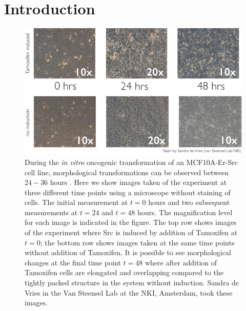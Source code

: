 
\section{Introduction}
\label{sec:introduction-mcf10}


\begin{figure}
  \centering
  \includegraphics[width=1\textwidth]{pics/mcf10a-experiment}
  \caption{
  During the {\it in vitro} oncogenic transformation of an MCF10A-Er-Src cell line, morphological transformations can be observed between $24-36$ hours \citep{Hirsch:2010ec}. Here we show images taken of the experiment at three different time points using a microscope without staining of cells. The initial measurement at $t=0$ hours and two subsequent measurements at $t=24$ and $t=48$ hours. The magnification level for each image is indicated in the figure. The top row shows images of the experiment where Src is induced by addition of Tamoxifen at $t=0$; the bottom row shows images taken at the same time points without addition of Tamoxifen. It is possible to see morphological changes at the final time point $t=48$ where after addition of Tamoxifen cells are elongated and overlapping compared to the tightly packed structure in the system without induction. Sandra de Vries in the Van Steensel Lab at the NKI, Amsterdam, took these images. %
  }
  \label{fig:exp-pics}
\end{figure}

